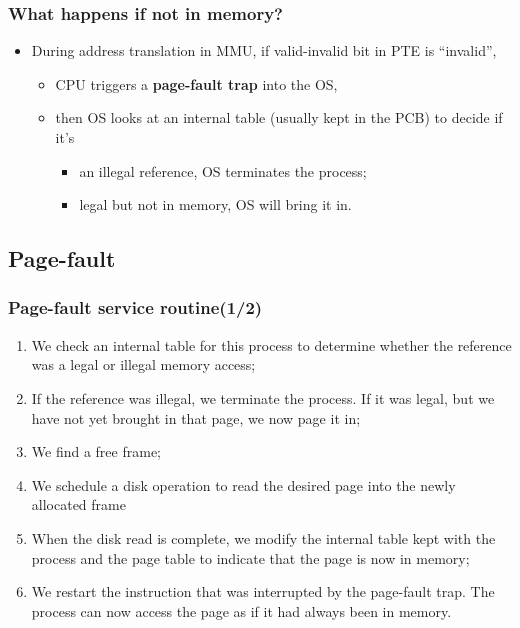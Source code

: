 \documentclass[CJKutf8,xcolor=pdftex,dvipsnames,table]{beamer}
\begin{document}
\begin{CJK*}{UTF8}{song}
  \begin{frame}
    \frametitle{What happens if not in memory?} \pause
    \begin{itemize}
    \item{During address translation in MMU, if valid-invalid bit in PTE is ``invalid'', } \pause
      \begin{itemize}
      \item{CPU triggers a \textbf{page-fault trap} into the OS,} \pause
      \item{then OS looks at an internal table (usually kept in the PCB) to decide if it's } \pause
        \begin{itemize}
        \item{an illegal reference, OS terminates the process;} \pause
        \item{legal but not in memory, OS will bring it in.}
        \end{itemize}
      \end{itemize}
    \end{itemize}
  \end{frame}

  \subsection{Page-fault}
  
  \begin{frame}
    \frametitle{Page-fault service routine(1/2)} \pause
    \begin{enumerate}\parskip=0pt
    \item{We check an internal table for this process to determine whether the
        reference was a legal or illegal memory access;} \pause
    \item{If the reference was illegal, we terminate the process. If it was
        legal, but we have not yet brought in that page, we now page it in;} \pause
    \item{We find a free frame;} \pause
    \item{We schedule a disk operation to read the desired page into the newly allocated frame} \pause
    \item{When the disk read is complete, we modify the internal table kept with the process and the page table to indicate that the page is now in memory;} \pause
    \item{We restart the instruction that was interrupted by the page-fault trap. The process can now access the page as if it had always been in memory.}
    \end{enumerate}
  \end{frame}
  

\end{CJK*}
\end{document}
